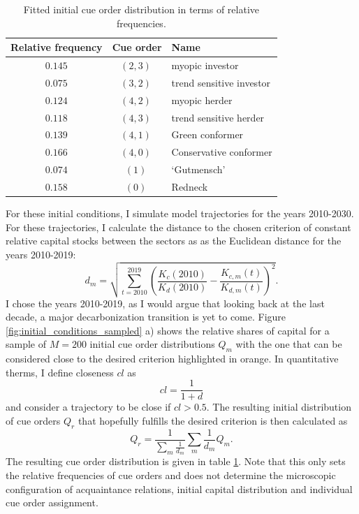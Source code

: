 \begin{table}[t]
    \centering
    \begin{tabular}{c|c|l}
        Relative frequency & Cue order & Name \\ \hline
        $0.145$&$(2, 3)~$&myopic investor\\
    $0.075$& $(3, 2)~$& trend sensitive investor\\
        $0.124$& $(4, 2)~$& myopic herder\\
        $0.118$& $(4, 3)~$& trend sensitive herder\\
        $0.139$& $(4, 1)~$& Green conformer\\
        $0.166$& $(4, 0)~$& Conservative conformer\\
        $0.074$& $(1)~$& `Gutmensch'\\
        $0.158$& $(0)~$& Redneck

    \end{tabular}
    \caption{Fitted initial cue order distribution in terms of relative frequencies.}
    \label{tab:initial_cue_order_dist}
\end{table}

For these initial conditions, I simulate model trajectories for the years 2010-2030. For these trajectories, I calculate the distance to the chosen criterion of constant relative capital stocks between the sectors as as the Euclidean distance for the years 2010-2019:
\begin{equation}
  d_m = \sqrt{\sum_{t=2010}^{2019}\left( \frac{K_c(2010)}{K_d(2010)} - \frac{K_{c,m}(t)}{K_{d,m}(t)} \right)^{2}}.
  \label{eq:distance_criterion}
\end{equation}
I chose the years 2010-2019, as I would argue that looking back at the last decade, a major decarbonization transition is yet to come.
Figure \ref{fig:initial_conditions_sampled} a) shows the relative shares of capital for a sample of $M=200$ initial cue order distributions $Q_m$ with the one that can be considered close to the desired criterion highlighted in orange. In quantitative therms, I define closeness $cl$ as
\begin{equation}
  cl = \frac{1}{1+d}
  \label{eq:closeness}
\end{equation}
and consider a trajectory to be close if $cl > 0.5$.
The resulting initial distribution of cue orders $Q_r$ that hopefully fulfills the desired criterion is then calculated as
\begin{equation}
    Q_r = \frac{1}{\sum_m \frac{1}{d_m}}\sum_{m}\frac{1}{d_m} Q_m.
  \label{eq:updated_cue_order_distribution}
\end{equation}
The resulting cue order distribution is given in table \ref{tab:initial_cue_order_dist}.
Note that this only sets the relative frequencies of cue orders and does not determine the microscopic configuration of acquaintance relations, initial capital distribution and individual cue order assignment.

